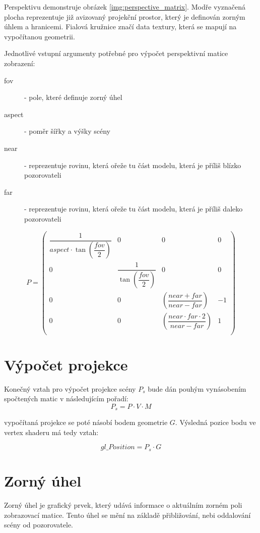 Perspektivu demonstruje obrázek \ref{img:perspective_matrix}. Modře vyznačená plocha reprezentuje již avizovaný projekční prostor, který je definován  zorným úhlem a hranicemi. Fialová kružnice značí data textury, která se mapují na vypočítanou geometrii.

\newpage

Jednotlivé vstupní argumenty potřebné pro výpočet perspektivní matice zobrazení:

\begin{description}
		\item[fov] - pole, které definuje zorný úhel
		\item[aspect] - poměr šířky a výšky scény
		\item[near] - reprezentuje rovinu, která ořeže tu část modelu, která je příliš blízko pozorovateli
		\item[far] - reprezentuje rovinu, která ořeže tu část modelu, která je příliš daleko pozorovateli
\end{description}


$$
P =
\begin{pmatrix} 
\dfrac{1}{aspect \cdot \tan\left(\dfrac{ fov }{2}\right)} & 0 & 0 & 0\\
0 & \dfrac{1}{\tan\left(\dfrac{ fov }{2}\right)} & 0 & 0\\ 
0 & 0 & \left(\dfrac{near+far}{near-far}\right) & -1\\ 
0 & 0 &  \left(\dfrac{near \cdot far \cdot 2}{near-far}\right)  & 1\\ 
\end{pmatrix}
$$



\newpage


\section{Výpočet projekce}
Konečný  vztah pro výpočet projekce scény $P_{s}$ bude dán pouhým vynásobením spočtených matic v následujícím pořadí:
$$ P_{s} = P \cdot V \cdot M  $$

 
vypočítaná projekce se poté násobí bodem geometrie $G$. Výsledná pozice bodu ve vertex shaderu má tedy   vztah:

$$ gl\_Position  = P_{s} \cdot G$$

\section{Zorný úhel}
Zorný úhel je grafický prvek, který udává informace o aktuálním zorném poli zobrazovací matice. Tento úhel se mění na základě přibližování, nebi oddalování scény od pozorovatele. 

